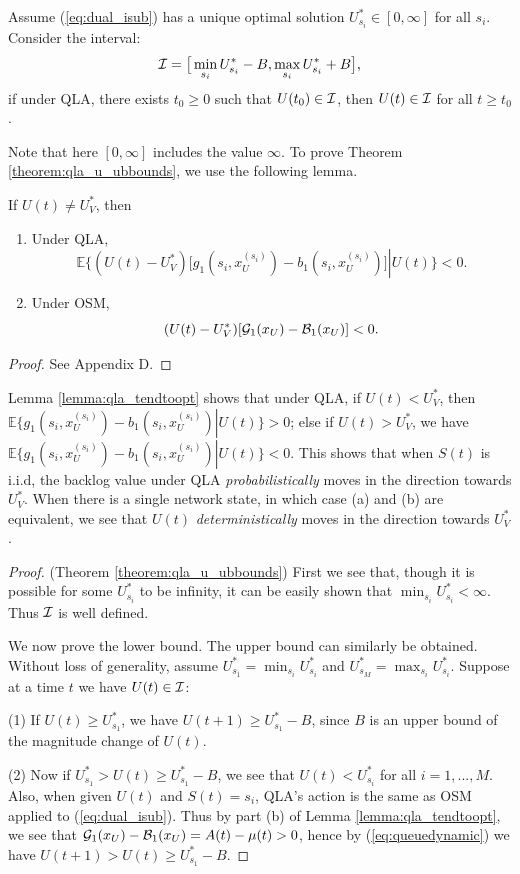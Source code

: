 \documentclass[journal]{IEEEtran}
\newcommand{\expect}[1]{\mathbb{E}\big\{#1\big\}}
\newcommand{\script}[1]{{{\cal{#1} }}}
\begin{document}
\begin{thm}\label{theorem:qla_u_ubbounds}
Assume (\ref{eq:dual_isub}) has a unique optimal solution $U^*_{s_i}\in[0,\infty]$ for all $s_i$. Consider the interval:  
\[\script{I}=\big[\min_{s_i}U^*_{s_i}-B, \max_{s_i}U^*_{s_i}+B\big],\]  
if under QLA, there exists $t_0\geq0$ such that $U(t_0)\in \script{I}$, then $U(t)\in \script{I}$ for all $t\geq t_0$.
\end{thm}

Note that here $[0,\infty]$ includes the value $\infty$. To prove Theorem \ref{theorem:qla_u_ubbounds}, we use the following lemma. 
\begin{lemma}\label{lemma:qla_tendtoopt}
If $U(t)\neq U^*_V$, then 
\begin{enumerate}
\item[(a)] Under QLA, \[\expect{(U(t)-U_V^*)\big[g_{1}(s_i, x^{(s_i)}_{U})-b_{1}(s_i, x^{(s_i)}_{U})\big]\left|\right.U(t)}<0.\]
\item[(b)] Under OSM, \[(U(t)-U_V^*)[\script{G}_1(x_U)-\script{B}_1(x_U)]<0.\]
\end{enumerate}
\end{lemma}
\begin{proof}
See Appendix D.
\end{proof}

Lemma \ref{lemma:qla_tendtoopt} shows that under QLA, if $U(t)<U_V^*$, then $\expect{g_1(s_i, x^{(s_i)}_{U})-b_1(s_i, x^{(s_i)}_{U})\left|\right. U(t)}>0$; else if  $U(t)>U_V^*$, we have $\expect{g_1(s_i, x^{(s_i)}_{U})-b_1(s_i, x^{(s_i)}_{U})\left|\right. U(t)}<0$. This shows that when $S(t)$ is i.i.d, the backlog value under QLA \emph{probabilistically} moves in the direction towards $U^*_V$. When there is a single network state, in which case (a) and (b) are equivalent, we see that $U(t)$ \emph{deterministically} moves in the direction towards $U^*_V$. 

\begin{proof} (Theorem \ref{theorem:qla_u_ubbounds})
First we see that, though it is possible for some $U^*_{s_i}$ to be infinity, it can be easily shown  that $\min_{s_i}U^*_{s_i}<\infty$. Thus $\script{I}$ is well defined. 

We now prove the lower bound. The upper bound can similarly be obtained. Without loss of generality, assume $U^*_{s_1}=\min_{s_i}U^*_{s_i}$ and $U^*_{s_M}=\max_{s_i}U^*_{s_i}$. Suppose at a time $t$ we have $U(t)\in \script{I}$:

(1) If  $U(t)\geq U^*_{s_1}$, we have $U(t+1)\geq U^*_{s_1}-B$, since $B$ is an upper bound of the magnitude change of $U(t)$. 

(2) Now if $U^*_{s_1}>U(t)\geq U^*_{s_1}-B$, we see that  $U(t)< U^*_{s_i}$ for all $i=1,...,M$. Also, when given $U(t)$ and $S(t)=s_i$, QLA's action is the same as OSM applied to (\ref{eq:dual_isub}). Thus by part (b) of Lemma \ref{lemma:qla_tendtoopt}, we see that $\script{G}_1(x_U)-\script{B}_1(x_U)=A(t)-\mu(t)>0$, hence by (\ref{eq:queuedynamic}) we have $U(t+1)>U(t)\geq U^*_{s_1}-B$. 
\end{proof}
\end{document}
